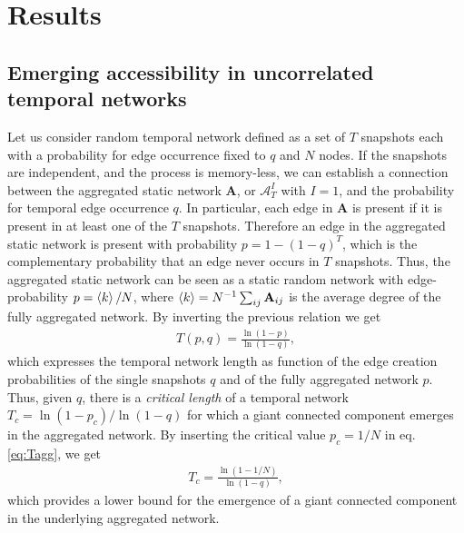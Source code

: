 \documentclass[%
 reprint,
 amsmath,amssymb,
 aps,
]{revtex4-2}
\begin{document}
\section{\label{sec:results}Results}


\subsection{\label{sec:ANAresults}
Emerging accessibility in uncorrelated temporal networks}


Let us consider random temporal network defined as a set of $T$ snapshots each with a probability for edge occurrence fixed to $q$ and $N$ nodes.
If the snapshots are independent, and the process is memory-less, we can establish a connection between the aggregated static network $\mathbf{A}$, or $\mathcal{A}^I_T$ with $I=1$, and the probability for temporal edge occurrence $q$.
In particular, each edge in $\mathbf{A}$ is present if it is present in at least one of the $T$ snapshots. Therefore an edge in the aggregated static network is present with probability $p=1-(1-q)^T$, which is the complementary probability that an edge never occurs in $T$ snapshots. Thus, the aggregated static network can be seen as a static random network with edge-probability $p=\braket{k}/N$, where $\braket{k}=N^{-1}\sum_{ij}\mathbf{A}_{ij}$ is the average degree of the fully aggregated network.
By inverting the previous relation we get  
\begin{eqnarray}
T(p,q)=\frac{\ln(1-p)}{\ln(1-q)}
\label{eq:Tagg},
\end{eqnarray}
which expresses the temporal network length as function of the edge creation probabilities of the single snapshots $q$ and of the fully aggregated network $p$.
Thus, given $q$, there is a \emph{critical length} of a temporal network  $T_c={\ln(1-p_c)}/{\ln(1-q)}$ for which a giant connected component emerges in the aggregated network. 
By inserting the critical value $p_c=1/N$ \cite{ERevolution} in eq. \eqref{eq:Tagg}, we get
\begin{eqnarray}
T_c=\frac{\ln(1-{1}/{N})}{\ln(1-q)}
\label{eq:TC1},
\end{eqnarray}
which provides a lower bound for the emergence of a giant connected component in the underlying aggregated network.
\end{document}
